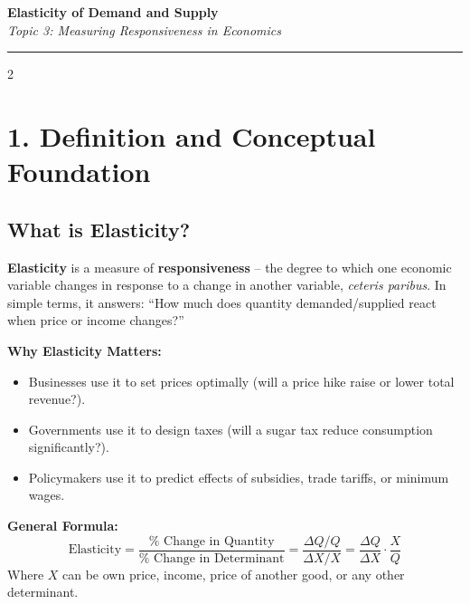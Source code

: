 \documentclass[10pt,a4paper]{article}
\begin{document}
\begin{center}
{\LARGE \textbf{Elasticity of Demand and Supply}}\\[0.15cm]
{\normalsize \textit{Topic 3: Measuring Responsiveness in Economics}}\\[0.15cm]
\hrule
\end{center}
\vspace{-0.3cm}

\begin{multicols}{2}
\footnotesize

\section*{1. Definition and Conceptual Foundation}

\subsection*{What is Elasticity?}
\textbf{Elasticity} is a measure of \textbf{responsiveness} -- the degree to which one economic variable changes in response to a change in another variable, \textit{ceteris paribus}. In simple terms, it answers: ``How much does quantity demanded/supplied react when price or income changes?''

\textbf{Why Elasticity Matters:}
\begin{itemize}[leftmargin=*,nosep]
    \item Businesses use it to set prices optimally (will a price hike raise or lower total revenue?).
    \item Governments use it to design taxes (will a sugar tax reduce consumption significantly?).
    \item Policymakers use it to predict effects of subsidies, trade tariffs, or minimum wages.
\end{itemize}

\textbf{General Formula:}
\[
\text{Elasticity} = \frac{\% \text{ Change in Quantity}}{\% \text{ Change in Determinant}} = \frac{\Delta Q / Q}{\Delta X / X} = \frac{\Delta Q}{\Delta X} \cdot \frac{X}{Q}
\]
Where $X$ can be own price, income, price of another good, or any other determinant.


\end{multicols}
\end{document}
